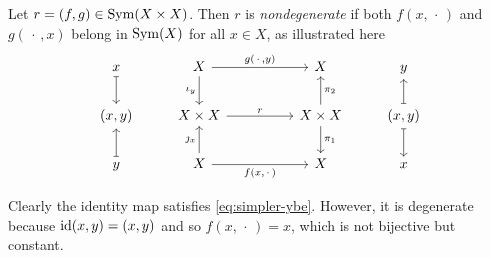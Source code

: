 \begin{defn}
    Let $r=(f,g)\in{\rm Sym}(X\times X)$. Then $r$ is \textsl{nondegenerate} if both $f(x,\,\cdot\,)$ and $g(\,\cdot\,,x)$ belong in ${\rm Sym}(X)$ for all $x\in X$, as illustrated here
    {\small
    $$
        \begin{tikzcd}
            x
                    \arrow[d,mapsto]
                &X
                    \arrow[rr,"{g(\,\cdot\,,y)}"]
                    \arrow[d,"\iota_y"']
                &&X
                &y\\
            {(x,y)}
            &X\times X
                    \arrow[rr,"r"]
                &&X\times X
                    \arrow[d,"\pi_1"]
                    \arrow[u,"\pi_2"']
                &{(x,y)}
                    \arrow[u,mapsto]
                    \arrow[d,mapsto]\\
                    y\arrow[u,mapsto]
                &X
                    \arrow[rr,"{f(x,\,\cdot\,)}"']
                    \arrow[u,"\jmath_x"]
                &&X
                &x
        \end{tikzcd}
    $$}
\end{defn}

\begin{rem}
    Clearly the identity map satisfies \eqref{eq:simpler-ybe}. However, it is degenerate because $\operatorname{id}(x,y)=(x,y)$ and so $f(x,\,\cdot\,)=x$, which is not bijective but constant.
\end{rem}
    
